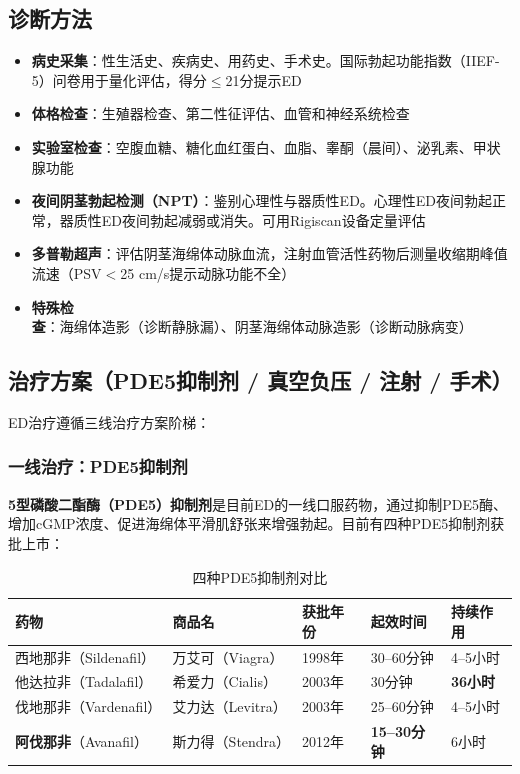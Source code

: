 \subsection{诊断方法}

\begin{itemize}[leftmargin=2cm]
	\item \textbf{病史采集}：性生活史、疾病史、用药史、手术史。国际勃起功能指数（IIEF-5）问卷用于量化评估，得分$\leq$21分提示ED
	\item \textbf{体格检查}：生殖器检查、第二性征评估、血管和神经系统检查
	\item \textbf{实验室检查}：空腹血糖、糖化血红蛋白、血脂、睾酮（晨间）、泌乳素、甲状腺功能
	\item \textbf{夜间阴茎勃起检测（NPT）}：鉴别心理性与器质性ED。心理性ED夜间勃起正常，器质性ED夜间勃起减弱或消失。可用Rigiscan设备定量评估
	\item \textbf{多普勒超声}：评估阴茎海绵体动脉血流，注射血管活性药物后测量收缩期峰值流速（PSV$<$25 cm/s提示动脉功能不全）
	\item \textbf{特殊检查}：海绵体造影（诊断静脉漏）、阴茎海绵体动脉造影（诊断动脉病变）
\end{itemize}

\subsection{治疗方案（PDE5抑制剂 / 真空负压 / 注射 / 手术）}

ED治疗遵循三线治疗方案阶梯：

\subsubsection{一线治疗：PDE5抑制剂}

\textbf{5型磷酸二酯酶（PDE5）抑制剂}是目前ED的一线口服药物，通过抑制PDE5酶、增加cGMP浓度、促进海绵体平滑肌舒张来增强勃起。目前有四种PDE5抑制剂获批上市：

\begin{table}[htbp]
\centering
\caption{四种PDE5抑制剂对比}
\label{tab:pde5_inhibitors}
\begin{tabularx}{\textwidth}{@{}lllll@{}}
    \toprule
    \textbf{药物} & \textbf{商品名} & \textbf{获批年份} & \textbf{起效时间} & \textbf{持续作用} \\
    \midrule
    西地那非（Sildenafil） & 万艾可（Viagra） & 1998年 & 30--60分钟 & 4--5小时 \\
    他达拉非（Tadalafil） & 希爱力（Cialis） & 2003年 & 30分钟 & \textbf{36小时} \\
    伐地那非（Vardenafil） & 艾力达（Levitra） & 2003年 & 25--60分钟 & 4--5小时 \\
    \textbf{阿伐那非}（Avanafil） & 斯力得（Stendra） & 2012年 & \textbf{15--30分钟} & 6小时 \\
    \bottomrule
\end{tabularx}
\end{table}

